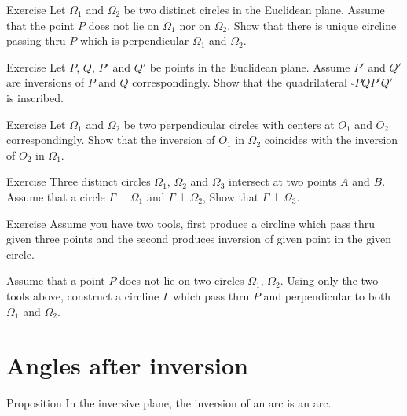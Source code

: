 \begin{thm}{Exercise}\label{ex:cline-perp-to-two}
Let $\Omega_1$ and $\Omega_2$ be two distinct circles in the Euclidean plane.
Assume that the point $P$ does not lie on $\Omega_1$ nor on $\Omega_2$.
Show that there is unique circline passing thru $P$ which is perpendicular $\Omega_1$ and $\Omega_2$.
\end{thm}

\begin{thm}{Exercise}\label{ex:inscribed+inv}
Let $P$, $Q$, $P'$ and $Q'$ be points in the Euclidean plane.
Assume $P'$ and $Q'$ are inversions 
of $P$ and $Q$ correspondingly.
Show that the quadrilateral $\square PQP'Q'$ is inscribed.
\end{thm}

\begin{thm}{Exercise}\label{ex:centers-of-perp-circles}
Let $\Omega_1$ and $\Omega_2$ be two perpendicular circles with centers at $O_1$ and $O_2$ correspondingly.
Show that the inversion of $O_1$ in $\Omega_2$ 
coincides with 
the inversion of $O_2$ in $\Omega_1$.
\end{thm}

\begin{thm}{Exercise}\label{ex:4-th-perp-circ}
Three distinct circles $\Omega_1$, $\Omega_2$ and $\Omega_3$ intersect at two points $A$ and $B$.
Assume that a circle $\Gamma\perp\Omega_1$ and $\Gamma\perp\Omega_2$,
Show that $\Gamma\perp\Omega_3$.
\end{thm}

\begin{thm}{Exercise}\label{ex:construction-perp-clines}
Assume you have two tools,
first produce a circline which pass thru given three points 
and the second produces inversion of given point in the given circle.

Assume that a point $P$ does not lie on two circles $\Omega_1$, $\Omega_2$.
Using only the two tools above,
construct a circline $\Gamma$ which pass thru $P$ 
and perpendicular to both $\Omega_1$ and $\Omega_2$.
\end{thm}

\section*{Angles after inversion}

\begin{thm}{Proposition}
In the inversive plane,
the inversion of an arc is an arc.
\end{thm}

